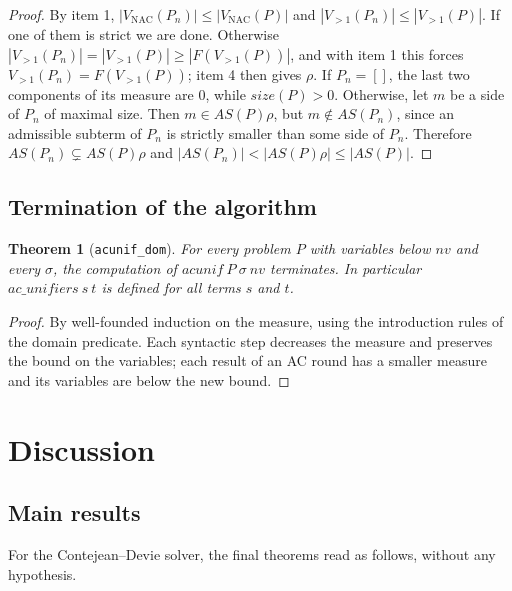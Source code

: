 \documentclass[11pt,a4paper]{article}
\newtheorem{theorem}{Theorem}[section]
\theoremstyle{definition}
\theoremstyle{remark}
\newcommand{\isa}[1]{\mbox{\small\texttt{#1}}}
\newcommand{\VNAC}{V_{\mathrm{NAC}}}
\newcommand{\Vtwo}{V_{>1}}
\newcommand{\AS}{\mathit{AS}}
\newcommand{\psize}{\mathit{size}}
\begin{document}
\begin{proof}
  By item 1, $|\VNAC(P_n)| \le |\VNAC(P)|$ and $|\Vtwo(P_n)| \le |\Vtwo(P)|$. If one of them is
  strict we are done. Otherwise $|\Vtwo(P_n)| = |\Vtwo(P)| \ge |F(\Vtwo(P))|$, and with item 1 this
  forces $\Vtwo(P_n) = F(\Vtwo(P))$; item 4 then gives $\rho$. If $P_n = []$, the last two
  components of its measure are $0$, while $\psize(P) > 0$. Otherwise, let $m$ be a side of $P_n$
  of maximal size. Then $m \in \AS(P)\rho$, but $m \notin \AS(P_n)$, since an admissible subterm
  of $P_n$ is strictly smaller than some side of $P_n$. Therefore
  $\AS(P_n) \subsetneq \AS(P)\rho$ and $|\AS(P_n)| < |\AS(P)\rho| \le |\AS(P)|$.
\end{proof}

\subsection{Termination of the algorithm}

\begin{theorem}[\isa{acunif\_dom}]
  For every problem $P$ with variables below $\mathit{nv}$ and every $\sigma$, the computation of
  $\mathit{acunif}\ P\ \sigma\ \mathit{nv}$ terminates. In particular
  $\mathit{ac\_unifiers}\ s\ t$ is defined for all terms $s$ and $t$.
\end{theorem}

\begin{proof}
  By well-founded induction on the measure, using the introduction rules of the domain predicate.
  Each syntactic step decreases the measure and preserves the bound on the variables; each result
  of an AC round has a smaller measure and its variables are below the new bound.
\end{proof}

\section{Discussion}\label{sec:disc}

\subsection{Main results}

For the Contejean--Devie solver, the final theorems read as follows, without any hypothesis.
\end{document}

